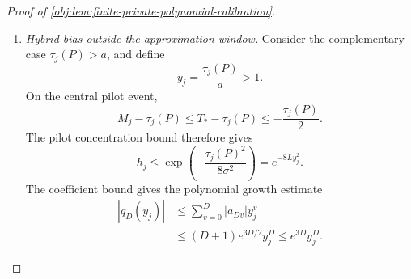 \begin{proof}[Proof of \cref{obj:lem:finite-private-polynomial-calibration}]
\begin{enumerate}
The elementary exponential envelopes give
\[
\tau_j(P)e^{-\tau_j(P)^2/(2\sigma^2)}\le\sigma,
\qquad
\tau_j(P)^2e^{-\tau_j(P)^2/(2\sigma^2)}\le\sigma^2.
\]
For the first inequality, multiply
\[
\frac{\tau_j(P)}{\sigma}
\le1+\frac{\tau_j(P)^2}{2\sigma^2}
\le e^{\tau_j(P)^2/(2\sigma^2)}
\]
by \(\sigma e^{-\tau_j(P)^2/(2\sigma^2)}\). For the second, use the elementary maximum
\[
u e^{-u}\le e^{-1}\qquad(u\ge0)
\]
at \(u=\tau_j(P)^2/(2\sigma^2)\), together with \(2/e\le1\). Consequently,
\[
\tau_j(P)w_j\le\sigma e^{-8L},
\qquad
\tau_j(P)^2w_j\le\sigma^2e^{-8L}\le\sigma^2.
\]
Moreover,
\[
\sqrt L\le L\le e^{8L},
\qquad
e^{-8L}\le\frac1{\sqrt L},
\qquad
\tau_j(P)w_j\le\frac{\sigma}{\sqrt L}.
\]

Suppose in addition that \(\tau_j(P)\le a\). Approximation and the degree lower bound imply
\[
\begin{aligned}
|p_{a,D}(\tau_j(P))-\tau_j(P)|
&\le\frac{2a}{\pi(D+1)}
\le\frac a{D+1}\\
&\le16384\,\frac{\sigma}{\sqrt L}.
\end{aligned}
\]
To compute the hybrid mean, its three disjoint pilot branches give
\[
H_j
=\widehat p_{a,D,j}\mathbf1_{\{|M_j|\le T_*\}}
+\overline W_j\mathbf1_{\{M_j>T_*\}}
-\overline W_j\mathbf1_{\{M_j<-T_*\}}.
\]
Block independence, polynomial unbiasedness, and the probability partition yield
\[
\begin{aligned}
\mathbb EH_j
&=h_jp_{a,D}(\tau_j(P))
 +(1-h_j-2w_j)\tau_j(P),\\
\mathbb EH_j-\tau_j(P)
&=h_j\bigl(p_{a,D}(\tau_j(P))-\tau_j(P)\bigr)
 -2\tau_j(P)w_j.
\end{aligned}
\]
Hence, throughout \(0\le\tau_j(P)\le a\),
\[
\begin{aligned}
|\mathbb EH_j-\tau_j(P)|
&\le h_j|p_{a,D}(\tau_j(P))-\tau_j(P)|
       +2\tau_j(P)w_j\\
&\le(16384+2)\frac{\sigma}{\sqrt L}
\le20000\,\frac{\sigma}{\sqrt L}.
\end{aligned}
\]

\item \textit{Hybrid bias outside the approximation window.}
Consider the complementary case \(\tau_j(P)>a\), and define
\[
y_j=\frac{\tau_j(P)}a>1.
\]
On the central pilot event,
\[
M_j-\tau_j(P)
\le T_*-\tau_j(P)
\le-\frac{\tau_j(P)}2.
\]
The pilot concentration bound therefore gives
\[
h_j
\le\exp\!\left(-\frac{\tau_j(P)^2}{8\sigma^2}\right)
=e^{-8Ly_j^2}.
\]
The coefficient bound gives the polynomial growth estimate
\[
\begin{aligned}
|q_D(y_j)|
&\le\sum_{v=0}^D|a_{Dv}|y_j^v\\
&\le(D+1)e^{3D/2}y_j^D
\le e^{3D}y_j^D.
\end{aligned}
\]


\end{enumerate}
\end{proof}
